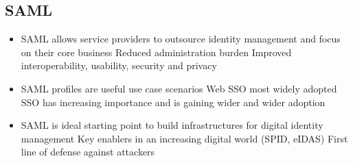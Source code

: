 \documentclass[12pt, a4paper]{article}
\begin{document}
\subsection{SAML}
\begin{itemize}
    \item SAML allows service providers to outsource identity management and focus on
    their core business
    \subitem Reduced administration burden
    \subitem Improved interoperability, usability, security and privacy
    \item SAML profiles are useful use case scenarios
    \subitem Web SSO most widely adopted
    \subitem SSO has increasing importance and is gaining wider and wider adoption
    \item SAML is ideal starting point to build infrastructures for digital identity management
    \subitem Key enablers in an increasing digital world (SPID, eIDAS)
    \subitem First line of defense against attackers
\end{itemize}
\end{document}
